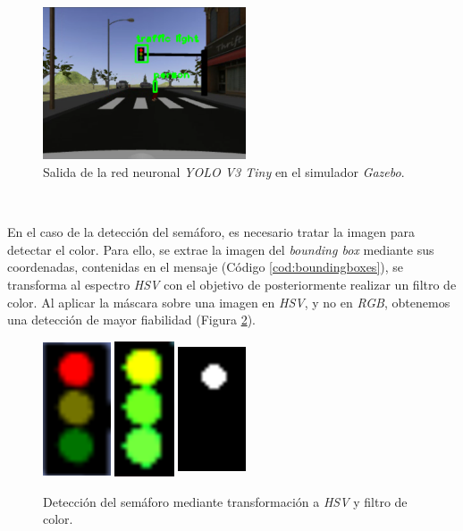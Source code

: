 \begin{figure} [h!]
	\begin{center}
		\includegraphics[width=6cm]{figs/darknetSimulator}
	\end{center}
	\caption{Salida de la red neuronal \textit{YOLO V3 Tiny} en el simulador \textit{Gazebo}.}
	\label{fig:darknetsimulator}
\end{figure}\

En el caso de la detección del semáforo, es necesario tratar la imagen para detectar el color. Para ello, se extrae la imagen del \textit{bounding box} mediante sus coordenadas, contenidas en el mensaje (Código \ref{cod:boundingboxes}), se transforma al espectro \textit{HSV} con el objetivo de posteriormente realizar un filtro de color. Al aplicar la máscara sobre una imagen en \textit{HSV}, y no en \textit{RGB}, obtenemos una detección de mayor fiabilidad (Figura \ref{fig:detector}).\\

\begin{figure} [h!]
	\begin{center}
		\includegraphics[width=2cm, height=4cm]{figs/cropped}\hspace{2cm}\includegraphics[width=2cm, height=4cm]{figs/hsv}\hspace{2cm}\includegraphics[width=2cm,
			height=4cm]{figs/mask}
	\end{center}
	\caption{Detección del semáforo mediante transformación a \textit{HSV} y filtro de color.}
	\label{fig:detector}
\end{figure}\

